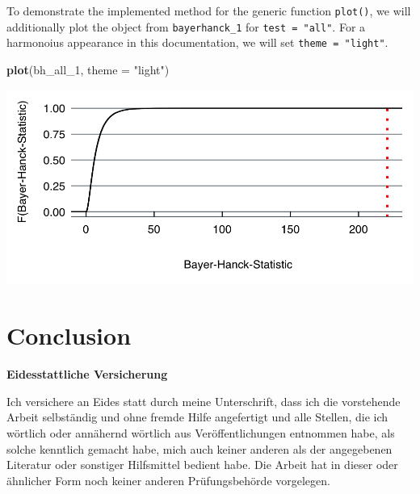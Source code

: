 \documentclass[11pt,a4paper]{article}
\let\origfigure\figure
\let\endorigfigure\endfigure
\renewenvironment{figure}[1][2] {
    \expandafter\origfigure\expandafter[H]
} {
    \endorigfigure
}
\newenvironment{Shaded}{\begin{snugshade}}{\end{snugshade}}
\newcommand{\DataTypeTok}[1]{\textcolor[rgb]{0.13,0.29,0.53}{#1}}
\newcommand{\DecValTok}[1]{\textcolor[rgb]{0.00,0.00,0.81}{#1}}
\newcommand{\KeywordTok}[1]{\textcolor[rgb]{0.13,0.29,0.53}{\textbf{#1}}}
\newcommand{\NormalTok}[1]{#1}
\newcommand{\StringTok}[1]{\textcolor[rgb]{0.31,0.60,0.02}{#1}}
\begin{document}
To demonstrate the implemented method for the generic function
\texttt{plot()}, we will additionally plot the object from
\texttt{bayerhanck\_1} for \texttt{test\ =\ "all"}. For a harmonoius
appearance in this documentation, we will set
\texttt{theme\ =\ "light"}.

\begin{Shaded}
\begin{Highlighting}[]
\KeywordTok{plot}\NormalTok{(bh_all_}\DecValTok{1}\NormalTok{, }\DataTypeTok{theme =} \StringTok{"light"}\NormalTok{)}
\end{Highlighting}
\end{Shaded}

\begin{figure}
\centering
\includegraphics{plot_bh.png}
\caption{Cumulative Distribution Function under \(\mathcal{H}_0\)}
\end{figure}

\hypertarget{conclusion}{%
\section{Conclusion}\label{conclusion}}

\newpage
\renewcommand*{\mkbibnamefamily}[1]{\textbf{#1}}
\renewcommand*{\mkbibnamegiven}[1]{\textbf{#1}}
\renewcommand*{\mkbibnameprefix}[1]{\textbf{#1}}
\renewcommand*{\mkbibnamesuffix}[1]{\textbf{#1}}
\printbibliography[title=References]

\newpage
\textbf{Eidesstattliche Versicherung}

\bigskip

Ich versichere an Eides statt durch meine Unterschrift, dass ich die vorstehende Arbeit selbständig und ohne fremde Hilfe angefertigt und alle Stellen, die ich wörtlich oder annähernd wörtlich aus Veröffentlichungen entnommen habe, als solche kenntlich gemacht habe, mich auch keiner anderen als der angegebenen Literatur oder sonstiger Hilfsmittel bedient habe. Die Arbeit hat in dieser oder ähnlicher Form noch keiner anderen Prüfungsbehörde vorgelegen.

\vspace{1cm}
\rule{0pt}{2\baselineskip} %
\par\noindent{} \hfill\makebox[2.25in]{\hrulefill}%
\par\noindent\makebox[2.25in][l]{} \hfill{}%
\end{document}
